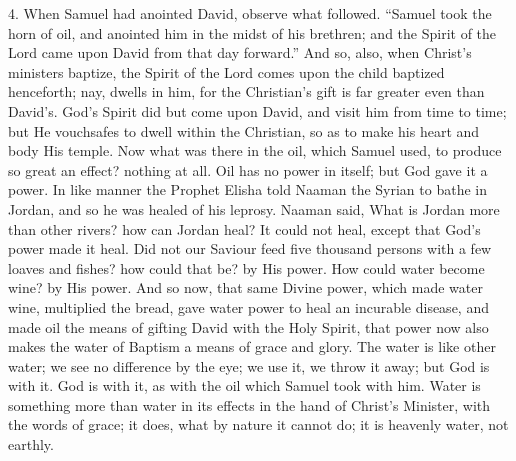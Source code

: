 4. When Samuel had anointed David, observe what followed.
``Samuel took the horn of oil, and anointed him in the midst of
his brethren; and the Spirit of the Lord came upon David from that day
forward.'' And so, also, when Christ's ministers baptize, the
Spirit of the Lord comes upon the child baptized henceforth; nay,
dwells in him, for the Christian's gift is far greater even than
David's. God's Spirit did but come upon David, and visit him from time
to time; but He vouchsafes to dwell within the Christian, so as to
make his heart and body His temple. Now what was there in the oil,
which Samuel used, to produce so great an effect? nothing at all. Oil
has no power in itself; but God gave it a power. In like manner the
Prophet Elisha told Naaman the Syrian to bathe in Jordan, and so he
was healed of his leprosy. Naaman said, What is Jordan more than other
rivers? how can Jordan heal? It could not heal, except that God's
power made it heal. Did not our Saviour feed five thousand persons
with a few loaves and fishes? how could that be? by His power. How
could water become wine? by His power. And so now, that same Divine
power, which made water wine, multiplied the bread, gave water power
to heal an incurable disease, and made oil the means of gifting David
with the Holy Spirit, that power now also makes the water of Baptism a
means of grace and glory. The water is like other water; we see no
difference by the eye; we use it, we throw it away; but God is with
it. God is with it, as with the oil which Samuel took with him. Water
is something more than water in its effects in the hand of Christ's
Minister, with the words of grace; it does, what by nature it cannot
do; it is heavenly water, not earthly.


